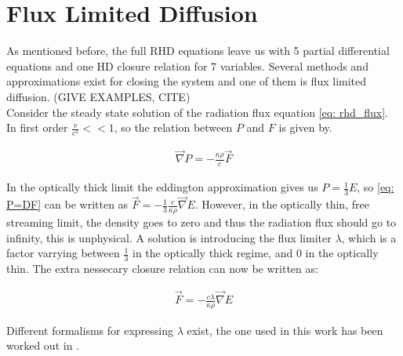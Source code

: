 \section{Flux Limited Diffusion} \label{section: introduction Flux Limited Diffusion}
As mentioned before, the full RHD equations leave us with 5 partial differential equations and one HD closure relation for 7 variables. Several methods and approximations exist for closing the system and one of them is flux limited diffusion. (GIVE EXAMPLES, CITE)\\

Consider the steady state solution of the radiation flux equation \eqref{eq: rhd_flux}. In first order $\frac{v}{c^2} << 1$, so the relation between $P$ and $F$ is given by.

\begin{align}
\vec{\nabla} P = - \frac{\kappa \rho}{c} \vec{F} \label{eq: P=DF}
\end{align}

In the optically thick limit the eddington approximation gives us $P = \frac{1}{3}E$, so \eqref{eq: P=DF} can be written as $\vec{F} = -\frac{1}{3}\frac{c}{\kappa \rho} \vec{\nabla}E$. However, in the optically thin, free streaming limit, the density goes to zero and thus the radiation flux should go to infinity, this is unphysical. A solution is introducing the flux limiter $\lambda$, which is a factor varrying between $\frac{1}{3}$ in the optically thick regime, and $0$ in the optically thin. The extra nessecary closure relation can now be written as:

\begin{align}
\vec{F} = -\frac{c\lambda}{\kappa \rho} \vec{\nabla}E \label{eq: fld_closing}
\end{align}

Different formalisms for expressing $\lambda$ exist, the one used in this work has been worked out in \cite{Levermore1981}. 